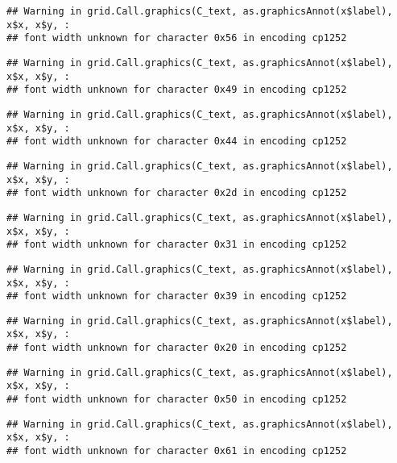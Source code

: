 \documentclass[
]{article}
\begin{document}
\begin{verbatim}
## Warning in grid.Call.graphics(C_text, as.graphicsAnnot(x$label), x$x, x$y, :
## font width unknown for character 0x56 in encoding cp1252
\end{verbatim}

\begin{verbatim}
## Warning in grid.Call.graphics(C_text, as.graphicsAnnot(x$label), x$x, x$y, :
## font width unknown for character 0x49 in encoding cp1252
\end{verbatim}

\begin{verbatim}
## Warning in grid.Call.graphics(C_text, as.graphicsAnnot(x$label), x$x, x$y, :
## font width unknown for character 0x44 in encoding cp1252
\end{verbatim}

\begin{verbatim}
## Warning in grid.Call.graphics(C_text, as.graphicsAnnot(x$label), x$x, x$y, :
## font width unknown for character 0x2d in encoding cp1252
\end{verbatim}

\begin{verbatim}
## Warning in grid.Call.graphics(C_text, as.graphicsAnnot(x$label), x$x, x$y, :
## font width unknown for character 0x31 in encoding cp1252
\end{verbatim}

\begin{verbatim}
## Warning in grid.Call.graphics(C_text, as.graphicsAnnot(x$label), x$x, x$y, :
## font width unknown for character 0x39 in encoding cp1252
\end{verbatim}

\begin{verbatim}
## Warning in grid.Call.graphics(C_text, as.graphicsAnnot(x$label), x$x, x$y, :
## font width unknown for character 0x20 in encoding cp1252
\end{verbatim}

\begin{verbatim}
## Warning in grid.Call.graphics(C_text, as.graphicsAnnot(x$label), x$x, x$y, :
## font width unknown for character 0x50 in encoding cp1252
\end{verbatim}

\begin{verbatim}
## Warning in grid.Call.graphics(C_text, as.graphicsAnnot(x$label), x$x, x$y, :
## font width unknown for character 0x61 in encoding cp1252
\end{verbatim}
\end{document}
